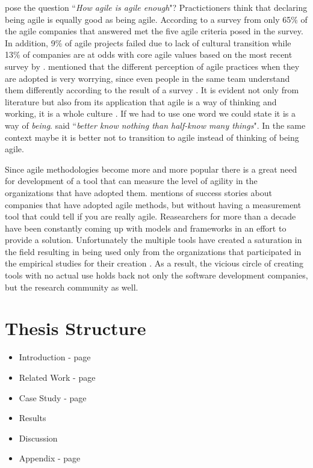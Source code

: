 \citet{comparative_agility} pose the question ``\textit{How agile is agile enough}"? Practictioners think that declaring being agile is equally good as being agile. According to a survey from \citet{ambysoft} only 65\% of the agile companies that answered met the five agile criteria posed in the survey. In addition, 9\% of agile projects failed due to lack of cultural transition while 13\% of companies are at odds with core agile values based on the most recent survey by \citet{versionOne}. \citet{poonacha} mentioned that the different perception of agile practices when they are adopted is very worrying, since even people in the same team understand them differently according to the result of a survey \cite{ambler}. It is evident not only from literature but also from its application that agile is a way of thinking and working, it is a whole culture \cite{poonacha}. If we had to use one word we could state it is a way of \textit{being}. \citet{Nietzsche} said ``\textit{better know nothing than half-know many things}". In the same context maybe it is better not to transition to agile instead of thinking of being agile. 

Since agile methodologies become more and more popular there is a great need for development of a tool that can measure the level of agility in the organizations that have adopted them. \citet{sidky} mentions of success stories about companies that have adopted agile methods, but without having a measurement tool that could tell if you are really agile. Reasearchers for more than a decade have been constantly coming up with models and frameworks in an effort to provide a solution. Unfortunately the multiple tools have created a saturation in the field resulting in being used only from the organizations that participated in the empirical studies for their creation \cite{samireh_jalali_dissertation}\cite{Jalali2014}. As a result, the vicious circle of creating tools with no actual use holds back not only the software development companies, but the research community as well.


\section{Thesis Structure} %
\begin{itemize}
	\item Introduction - page~\pageref{ch:introduction}
	\item Related Work - page~\pageref{ch:related_work}
	\item Case Study - page~\pageref{ch:case_study}
	\item Results
	\item Discussion
	\item Appendix - page~\pageref{ch:appendices}
\end{itemize}




